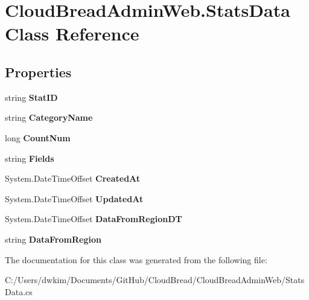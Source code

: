 \hypertarget{a00185}{}\section{Cloud\+Bread\+Admin\+Web.\+Stats\+Data Class Reference}
\label{a00185}
\subsection*{Properties}
\begin{DoxyCompactItemize}
\item 
string {\bfseries Stat\+ID}\hypertarget{a00185_a28ea961a9afea2729d8d2961549466a0}{}\label{a00185_a28ea961a9afea2729d8d2961549466a0}

\item 
string {\bfseries Category\+Name}\hypertarget{a00185_ae219e285aded384bc8e8f375cdce17f8}{}\label{a00185_ae219e285aded384bc8e8f375cdce17f8}

\item 
long {\bfseries Count\+Num}\hypertarget{a00185_ab033b6a3e7c6e0d0ef5ce7963caee4d1}{}\label{a00185_ab033b6a3e7c6e0d0ef5ce7963caee4d1}

\item 
string {\bfseries Fields}\hypertarget{a00185_a905c2cf818c788b1d7650b5fb675fdb8}{}\label{a00185_a905c2cf818c788b1d7650b5fb675fdb8}

\item 
System.\+Date\+Time\+Offset {\bfseries Created\+At}\hypertarget{a00185_a83dce5e4717d976155ca61d77eff34ed}{}\label{a00185_a83dce5e4717d976155ca61d77eff34ed}

\item 
System.\+Date\+Time\+Offset {\bfseries Updated\+At}\hypertarget{a00185_a177dfb28b3b8f3d9dadb2c502a67be23}{}\label{a00185_a177dfb28b3b8f3d9dadb2c502a67be23}

\item 
System.\+Date\+Time\+Offset {\bfseries Data\+From\+Region\+DT}\hypertarget{a00185_a3c32fd9aa019ed87b1f6b7af163bd628}{}\label{a00185_a3c32fd9aa019ed87b1f6b7af163bd628}

\item 
string {\bfseries Data\+From\+Region}\hypertarget{a00185_abb1cc8a7569238467e853d98fa9aeb86}{}\label{a00185_abb1cc8a7569238467e853d98fa9aeb86}

\end{DoxyCompactItemize}


The documentation for this class was generated from the following file\+:\begin{DoxyCompactItemize}
\item 
C\+:/\+Users/dwkim/\+Documents/\+Git\+Hub/\+Cloud\+Bread/\+Cloud\+Bread\+Admin\+Web/Stats\+Data.\+cs\end{DoxyCompactItemize}
